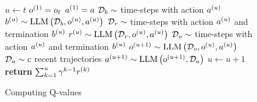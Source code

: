 \documentclass{article}
\DeclareMathOperator*{\LLM}{LLM}
\begin{document}
\begin{figure}[tb]
  \begin{algorithm}[H]
    \caption{Computing Q-values}
    \label{algo:q}
    \begin{algorithmic}[1]
      \State $u \gets t$
      \State $\Obs^1 = \Obs_t$
      \State $\Act^1 = \Act$
      \Repeat
      \State $\Buffer_{\Ter} \sim$ time-steps with action $\Act^u$ 
      \State $\Ter^u \sim \LLM\left(\Buffer_{\Ter}, \Obs^u, \Act^u\right)$
      \State $\Buffer_{\Rew} \sim$ time-steps with action $\Act^u$ and termination $\Ter^u$ 
      \State $\Rew^u \sim \LLM \left(\Buffer_{\Rew}, \Obs^u, \Act^u\right)$
      \State $\Buffer_{\Obs} \sim$ time-steps with action $\Act^u$ and termination $\Ter^u$ 
      \State $\Obs^{u+1} \sim \LLM \left(\Buffer_{\Obs}, \Obs^u, \Act^u\right)$
      \State $\BestTrajectories \sim \RecencyCutoff$ recent trajectories
      \State $\Act^{u+1} \sim \LLM\left(\Obs^{u+1}, \BestTrajectories\right)$
      \State $u \gets u + 1$
      \State \textbf{return} $\sum_{k=1}^{u} \gamma^{k - 1} \Rew^k$
      \EndFunction
    \end{algorithmic}
  \end{algorithm}
  \vspace{-20pt}
\end{figure}
\end{document}
